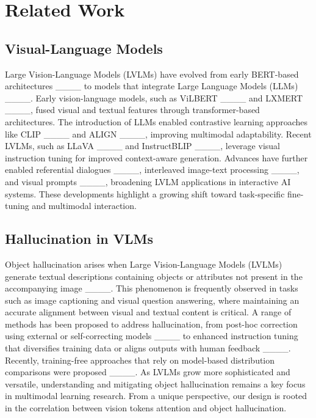 \section{Related Work}
\subsection{Visual-Language Models}
Large Vision-Language Models (LVLMs) have evolved from early BERT-based architectures ____ to models that integrate Large Language Models (LLMs) ____. Early vision-language models, such as ViLBERT ____ and LXMERT ____, fused visual and textual features through transformer-based architectures. The introduction of LLMs enabled contrastive learning approaches like CLIP ____ and ALIGN ____, improving multimodal adaptability. Recent LVLMs, such as LLaVA ____ and InstructBLIP ____, leverage visual instruction tuning for improved context-aware generation. Advances have further enabled referential dialogues ____, interleaved image-text processing ____, and visual prompts ____, broadening LVLM applications in interactive AI systems. These developments highlight a growing shift toward task-specific fine-tuning and multimodal interaction.

\subsection{Hallucination in VLMs}
Object hallucination arises when Large Vision-Language Models (LVLMs) generate textual descriptions containing objects or attributes not present in the accompanying image ____. This phenomenon is frequently observed in tasks such as image captioning and visual question answering, where maintaining an accurate alignment between visual and textual content is critical. A range of methods has been proposed to address hallucination, from post-hoc correction using external or self-correcting models ____ to enhanced instruction tuning that diversifies training data or aligns outputs with human feedback ____. Recently, training-free approaches that rely on model-based distribution comparisons were proposed ____. As LVLMs grow more sophisticated and versatile, understanding and mitigating object hallucination remains a key focus in multimodal learning research. From a unique perspective, our design is rooted in the correlation between vision tokens attention and object hallucination.